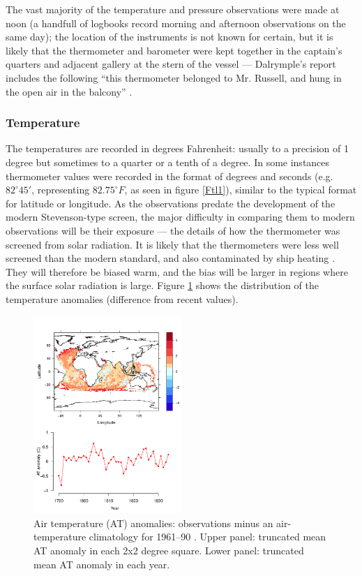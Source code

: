 \documentclass[CP]{copernicus}
\begin{document}
 The vast majority of the temperature and pressure observations were made at noon (a handfull of logbooks record morning and afternoon observations on the same day); the location of the instruments is not known for certain, but it is likely that the thermometer and barometer were kept together in the captain's quarters and adjacent gallery at the stern of the vessel --- Dalrymple's report includes the following ``this thermometer belonged to Mr. Russell, and hung in the open air in the balcony'' \citep{Dalrymple78}.

\subsubsection{Temperature}

The temperatures are recorded in degrees Fahrenheit: usually to a precision of 1 degree but sometimes to a quarter or a tenth of a degree. In some instances thermometer values were recorded in the format of degrees and seconds (e.g. $82^\circ 45'$, representing $82.75^\circ F$, as seen in figure \ref{Ftl1}), similar to the typical format for latitude or longitude. As the observations predate the development of the modern Stevenson-type screen, the major difficulty in comparing them to modern observations will be their exposure --- the details of how the thermometer was screened from solar radiation. It is likely that the thermometers were less well screened than the modern standard, and also contaminated by ship heating \citep{chenoweth00homogenization,Berry05}. They will therefore be biased warm, and the bias will be larger in regions where the surface solar radiation is large. Figure \ref{pwat1} shows the distribution of the temperature anomalies (difference from recent values).
\begin{figure}[!hbp]
\begin{center}
\includegraphics[angle=0, width=0.5\textwidth]{fig5.pdf}
\caption{Air temperature (AT) anomalies: observations minus an air-temperature climatology for 1961--90 \citep{rayner03HadISST1}. Upper panel: truncated mean AT anomaly in each 2x2 degree square. Lower panel: truncated mean AT anomaly in each year.}
\label{pwat1}
\end{center}
\end{figure}
\end{document}
